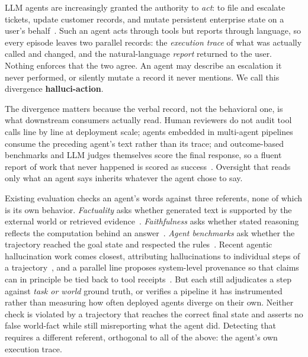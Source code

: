 LLM agents are increasingly granted the authority to \emph{act}: to file and
escalate tickets, update customer records, and mutate persistent enterprise
state on a user's behalf~\citep{liu2024agentbench, zhou2024webarena,
yao2024taubench}. Such an agent acts through tools but reports through
language, so every episode leaves two parallel records: the \emph{execution
trace} of what was actually called and changed, and the natural-language
\emph{report} returned to the user. Nothing enforces that the two agree. An
agent may describe an escalation it never performed, or silently mutate a
record it never mentions. We call this divergence \textbf{halluci-action}.

The divergence matters because the verbal record, not the behavioral one, is
what downstream consumers actually read. Human reviewers do not audit tool
calls line by line at deployment scale; agents embedded in multi-agent
pipelines consume the preceding agent's text rather than its trace; and outcome-based benchmarks and LLM judges
themselves score the final response, so a fluent report of work that never
happened is scored as success~\citep{khalifa2026gaming, agentrewardbench2025}.
Oversight that reads only what an agent says inherits whatever the agent chose
to say.

Existing evaluation checks an agent's words against three referents, none of
which is its own behavior. \emph{Factuality} asks whether generated text is
supported by the external world or retrieved evidence~\citep{lin2022truthfulqa,
min2023factscore, zhao2023felm}. \emph{Faithfulness} asks whether stated
reasoning reflects the computation behind an answer~\citep{turpin2023language,
lanham2023measuring, arcuschin2025wild, chen2025reasoning}. \emph{Agent
benchmarks} ask whether the trajectory reached the goal state and respected the
rules~\citep{yao2024taubench, cao2026pae, cuadron2025saber}. Recent agentic
hallucination work comes closest, attributing hallucinations to individual
steps of a trajectory~\citep{liu2026agenthallu, miragebench2025,
agent_hallu_survey2025}, and a parallel line proposes system-level provenance
so that claims can in principle be tied back to tool
receipts~\citep{basu2026toolreceipts, wang2026traceprovenance}. But each still
adjudicates a step against \emph{task or world} ground truth, or verifies a
pipeline it has instrumented rather than measuring how often deployed agents
diverge on their own. Neither check is violated by a trajectory that reaches the
correct final state and asserts no false world-fact while still misreporting
what the agent did. Detecting that requires a different referent, orthogonal to
all of the above: the agent's own execution trace.

